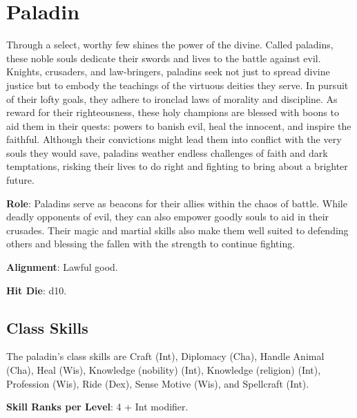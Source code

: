 \section{Paladin}

\label{f0}				
Through a select, worthy few shines the power of the divine. Called paladins, these noble souls dedicate their swords and lives to the battle against evil. Knights, crusaders, and law-bringers, paladins seek not just to spread divine justice but to embody the teachings of the virtuous deities they serve. In pursuit of their lofty goals, they adhere to ironclad laws of morality and discipline. As reward for their righteousness, these holy champions are blessed with boons to aid them in their quests: powers to banish evil, heal the innocent, and inspire the faithful. Although their convictions might lead them into conflict with the very souls they would save, paladins weather endless challenges of faith and dark temptations, risking their lives to do right and fighting to bring about a brighter future. 
				
\textbf{Role}: Paladins serve as beacons for their allies within the chaos of battle. While deadly opponents of evil, they can also empower goodly souls to aid in their crusades. Their magic and martial skills also make them well suited to defending others and blessing the fallen with the strength to continue fighting.
				
\textbf{Alignment}: Lawful good.
				
\textbf{Hit Die}: d10.
				
\subsection{Class Skills}

				
The paladin's class skills are Craft (Int), Diplomacy (Cha), Handle Animal (Cha), Heal (Wis), Knowledge (nobility) (Int), Knowledge (religion) (Int), Profession (Wis), Ride (Dex), Sense Motive (Wis), and Spellcraft (Int).
				
\textbf{Skill Ranks per Level}: 4 + Int modifier.

